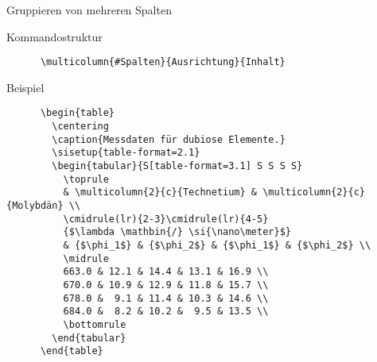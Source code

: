 \begin{frame}[fragile]{Gruppieren von mehreren Spalten}
  \begin{block}{Kommandostruktur}
    \begin{lstlisting}
      \multicolumn{#Spalten}{Ausrichtung}{Inhalt}
    \end{lstlisting}
  \end{block}
  \fontsize{8}{6}
  \begin{block}{Beispiel}
    \begin{lstlisting}
      \begin{table}
        \centering
        \caption{Messdaten für dubiose Elemente.}
        \sisetup{table-format=2.1}
        \begin{tabular}{S[table-format=3.1] S S S S}
          \toprule
          & \multicolumn{2}{c}{Technetium} & \multicolumn{2}{c}{Molybdän} \\
          \cmidrule(lr){2-3}\cmidrule(lr){4-5}
          {$\lambda \mathbin{/} \si{\nano\meter}$}
          & {$\phi_1$} & {$\phi_2$} & {$\phi_1$} & {$\phi_2$} \\
          \midrule
          663.0 & 12.1 & 14.4 & 13.1 & 16.9 \\
          670.0 & 10.9 & 12.9 & 11.8 & 15.7 \\
          678.0 &  9.1 & 11.4 & 10.3 & 14.6 \\
          684.0 &  8.2 & 10.2 &  9.5 & 13.5 \\
          \bottomrule
        \end{tabular}
      \end{table}
    \end{lstlisting}
  \end{block}
\end{frame}

